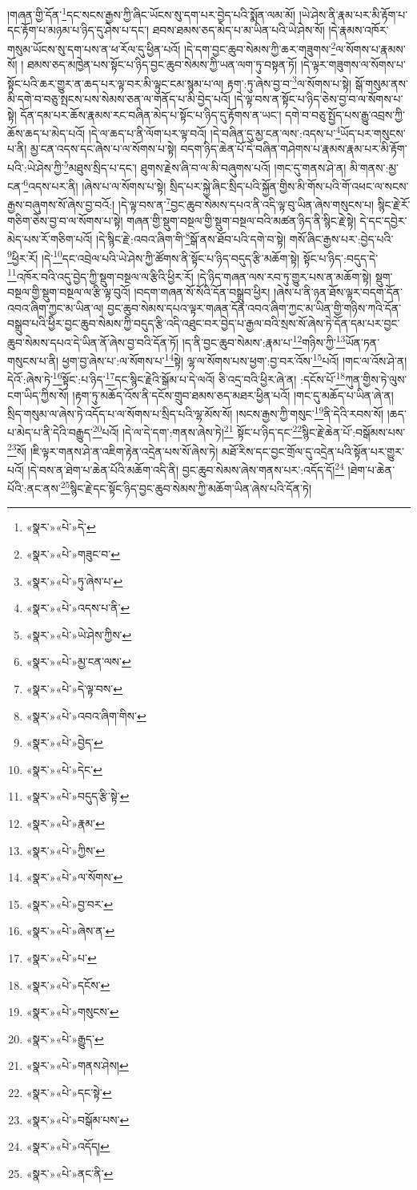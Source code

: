 །གཞན་གྱི་དོན་\footnote{«སྣར་»«པེ་»དེ་}དང་སངས་རྒྱས་ཀྱི་ཞིང་ཡོངས་སུ་དག་པར་བྱེད་པའི་སྨོན་ལམ་མོ། །ཡེ་ཤེས་ནི་རྣམ་པར་མི་རྟོག་པ་དང་རྟོག་པ་མཉམ་པ་ཉིད་དུ་ཤེས་པ་དང་། ཐབས་ཐམས་ཅད་མེད་པ་མ་ཡིན་པའི་ཡེ་ཤེས་སོ། །དེ་རྣམས་འཁོར་གསུམ་ཡོངས་སུ་དག་པས་ན་ཕ་རོལ་དུ་ཕྱིན་པའོ། །དེ་དག་བྱང་ཆུབ་སེམས་ཀྱི་ཆར་གཟུགས་\footnote{«སྣར་»«པེ་»གཟུང་བ་}ལ་སོགས་པ་རྣམས་སོ། །
ཐམས་ཅད་མཁྱེན་པས་སྟོང་པ་ཉིད་བྱང་ཆུབ་སེམས་ཀྱི་ཡན་ལག་ཏུ་བསྟན་ཏོ། །དེ་ལྟར་གཟུགས་ལ་སོགས་པ་སྟོང་པའི་ཆར་གྱུར་ན་ཆད་པར་ལྟ་བར་མི་ལྟུང་ངམ་སྙམ་པ་ལ། རྟག་:ཏུ་ཞེས་བྱ་བ་\footnote{«སྣར་»«པེ་»ཏུ་ཞེས་པ་}ལ་སོགས་པ་སྟེ། སྒོ་གསུམ་ནས་མི་དགེ་བ་བཅུ་སྤངས་པས་སེམས་ཅན་ལ་གནོད་པ་མི་བྱེད་པའོ། །དེ་ལྟ་བས་ན་སྟོང་པ་ཉིད་ཅེས་བྱ་བ་ལ་སོགས་པ་སྟེ། དོན་དམ་པར་ཆོས་རྣམས་རང་བཞིན་མེད་པ་སྟོང་པ་ཉིད་དུ་རྟོགས་ན་ཡང་། དགེ་བ་བཅུ་སྤྱོད་པས་རྒྱུ་འབྲས་ཀྱི་ཆོས་ཆད་པ་མེད་པའོ། །དེ་ལ་ཆད་པ་ནི་ལོག་པར་ལྟ་བའོ། །དེ་བཞིན་དུ་མྱ་ངན་ལས་:འདས་པ་\footnote{«སྣར་»«པེ་»འདས་པ་ནི་}ཡོད་པར་གསུངས་པ་ནི། མྱ་ངན་འདས་དང་ཞེས་པ་ལ་སོགས་པ་སྟེ། བདག་ཉིད་ཆེན་པོ་དེ་བཞིན་གཤེགས་པ་རྣམས་རྣམ་པར་མི་རྟོག་པའི་:ཡེ་ཤེས་ཀྱི་\footnote{«སྣར་»«པེ་»ཡེ་ཤེས་ཀྱིས་}མཐུས་སྲིད་པ་དང་། ཐུགས་རྗེས་ཞི་བ་ལ་མི་བཞུགས་པའོ། །གང་དུ་གནས་ཤེ་ན། མི་གནས་:མྱ་ངན་\footnote{«སྣར་»«པེ་»མྱ་ངན་ལས་}འདས་པར་ནི། །ཞེས་པ་ལ་སོགས་པ་སྟེ། སྲིད་པར་སྐྱེ་ཞིང་སྲིད་པའི་སྐྱོན་གྱིས་མི་གོས་པའི་གོ་འཕང་ལ་སངས་རྒྱས་བཞུགས་སོ་ཞེས་བྱ་བའོ:། །དེ་ལྟ་བས་ན་\footnote{«སྣར་»«པེ་»དེ་ལྟ་བས་}བྱང་ཆུབ་སེམས་དཔའ་ནི་འདི་ལྟ་བུ་ཡིན་ཞེས་གསུངས་པ། སྙིང་རྗེ་རོ་གཅིག་ཅེས་བྱ་བ་ལ་སོགས་པ་སྟེ། གཞན་གྱི་སྡུག་བསྔལ་གྱི་སྡུག་བསྔལ་བའི་མཚན་ཉིད་ནི་སྙིང་རྗེ་སྟེ། དེ་དང་དབྱེར་མེད་པས་རོ་གཅིག་པའོ། །དེ་སྙིང་རྗེ་:འབའ་ཞིག་གི་\footnote{«སྣར་»«པེ་»འབའ་ཞིག་གིས་}སྒོ་ནས་ཐོབ་པའི་དགེ་བ་སྟེ། གསོ་ཞིང་རྒྱས་པར་:བྱེད་པའི་\footnote{«སྣར་»«པེ་»བྱེད་}ཕྱིར་རོ། །དེ་\footnote{«སྣར་»«པེ་»དེང་}དང་འབྲེལ་པའི་ཡེ་ཤེས་ཀྱི་ཚོགས་ནི་སྟོང་པ་ཉིད་བདུད་རྩི་མཆོག་སྟེ། སྟོང་པ་ཉིད་:བདུད་དེ་\footnote{«སྣར་»«པེ་»བདུད་རྩི་སྟེ་}འཁོར་བའི་འདུ་བྱེད་ཀྱི་སྡུག་བསྔལ་ལ་རྩིའི་ཕྱིར་རོ། །དེ་ཉིད་གཞན་ལས་རབ་ཏུ་གྱུར་པས་ན་མཆོག་སྟེ། སྡུག་བསྔལ་གྱི་སྡུག་བསྔལ་ལ་རྩི་ལྟ་བུའོ། །བདག་གཞན་སོ་སོའི་དོན་བསྒྲུབ་ཕྱིར། །ཞེས་པ་ནི་ཉན་ཐོས་ལྟར་བདག་དོན་འབའ་ཞིག་ཀྱང་མ་ཡིན་ལ། བྱང་ཆུབ་སེམས་དཔའ་ལྟར་གཞན་དོན་འབའ་ཞིག་ཀྱང་མ་ཡིན་གྱི་གཉིས་ཀའི་དོན་བསྒྲུབ་པའི་ཕྱིར་བྱང་ཆུབ་སེམས་ཀྱི་བདུད་རྩི་འདི་འཐུང་བར་བྱེད་པ་རྒྱལ་བའི་སྲས་སོ་ཞེས་ཏེ་དོན་དམ་པར་བྱང་ཆུབ་སེམས་དཔའ་དེ་ཡིན་ནོ་ཞེས་བྱ་བའི་དོན་ཏོ། །ད་ནི་བྱང་ཆུབ་སེམས་:རྣམ་པ་\footnote{«སྣར་»«པེ་»རྣམ་}གཉིས་ཀྱི་\footnote{«སྣར་»«པེ་»ཀྱིས་}ཡོན་ཏན་གསུངས་པ་ནི། ཕྱག་བྱ་ཞེས་པ་:ལ་སོགས་པ་\footnote{«སྣར་»«པེ་»ལ་སོགས་}སྟེ། ལྷ་ལ་སོགས་པས་ཕྱག་:བྱ་བར་འོས་\footnote{«སྣར་»«པེ་»བྱ་བར་}པའོ། །གང་ལ་འོས་ཤེ་ན། དེའོ་:ཞེས་ཏེ་\footnote{«སྣར་»«པེ་»ཞེས་ན་}སྟོང་:པ་ཉིད་\footnote{«སྣར་»«པེ་»པ་}དང་སྙིང་རྗེའི་སྒོམ་པ་དེ་ལའོ། ཅི་འདྲ་བའི་ཕྱིར་ཞེ་ན། :དངོས་པོ་\footnote{«སྣར་»«པེ་»དངོས་}ཀུན་གྱིས་ཏེ་ལུས་ངག་ཡིད་ཀྱིས་སོ། །རྟག་ཏུ་མཆོད་འོས་ནི་དངོས་གྲུབ་ཐམས་ཅད་མཐར་ཕྱིན་པའོ། །གང་དུ་མཆོད་པ་ཡིན་ཞེ་ན། སྲིད་གསུམ་ལ་ཞེས་ཏེ་འདོད་པ་ལ་སོགས་པ་སྲིད་པའི་ལྷ་མོས་སོ། །སངས་རྒྱས་ཀྱི་གསུང་\footnote{«སྣར་»«པེ་»གསུངས་}ནི་དེའི་རབས་སོ། །ཆད་པ་མེད་པ་ནི་དེའི་བརྒྱུད་\footnote{«སྣར་»«པེ་»རྒྱུད་}པའོ། །དེ་ལ་དེ་དག་:གནས་ཞེས་ཏེ།\footnote{«སྣར་»«པེ་»གནས་ཤེས།} སྟོང་པ་ཉིད་དང་\footnote{«སྣར་»«པེ་»དང་སྟེ་}སྙིང་རྗེ་ཆེན་པོ་:བསྒོམས་པས་\footnote{«སྣར་»«པེ་»བསྒོམ་པས་}སོ། །ཇི་ལྟར་གནས་ཤེ་ན་འཇིག་རྟེན་འདྲེན་པས་སོ་ཞེས་ཏེ། མཐོ་རིས་དང་བྱང་གྲོལ་དུ་འདྲེན་པའི་སྟོན་པར་གྱུར་པའོ། །དེ་བས་ན་ཐེག་པ་ཆེན་པོའི་མཆོག་འདི་ནི། བྱང་ཆུབ་སེམས་ཞེས་གནས་པར་:འདོད་དོ།\footnote{«སྣར་»«པེ་»འདོད།} །ཐེག་པ་ཆེན་པོའི་:ནང་ནས་\footnote{«སྣར་»«པེ་»ནང་ནི་}སྙིང་རྗེ་དང་སྟོང་ཉིད་བྱང་ཆུབ་སེམས་ཀྱི་མཆོག་ཡིན་ཞེས་པའི་དོན་ཏེ། 